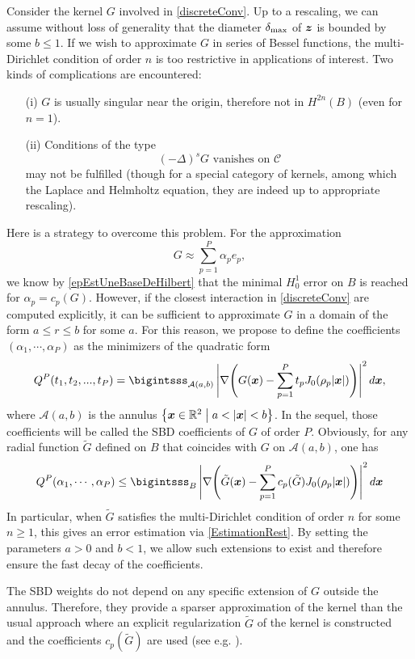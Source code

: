 \documentclass[11pt,a4paper]{article}
\begin{document}
Consider the kernel $G$ involved in \eqref{discreteConv}. Up to a rescaling, we can assume without loss of generality that the diameter $\delta_{\max}$ of $\boldsymbol{z}$ is bounded by some $b \leq 1$. 
If we wish to approximate $G$ in series of Bessel functions, the multi-Dirichlet condition of order $n$ is too restrictive in applications of interest. Two kinds of complications are encountered:
\begin{itemize}
	\item[(i)] $G$ is usually singular near the origin, therefore not in $H^{2n}(B)$ (even for $n=1$). 
	\item[(ii)] Conditions of the type 
	      \[(-\Delta)^s G \text{ vanishes on }\mathcal{C}\]   
	      may not be fulfilled (though for a special category of kernels, among which the Laplace and Helmholtz equation, they are indeed up to appropriate rescaling). 
\end{itemize}
Here is a strategy to overcome this problem. For the approximation 
\[G \approx \sum_{p = 1}^P \alpha_p e_p,\]
we know by \autoref{epEstUneBaseDeHilbert} that the minimal $H^1_0$ error on $B$ is reached for $\alpha_p = c_p(G)$. However, if the closest interaction in \eqref{discreteConv} are computed explicitly, it can be sufficient to approximate $G$ in a domain of the form $a \leq r \leq b$ for some $a$. For this reason, we propose to define the coefficients $(\alpha_1,\cdots,\alpha_P)$ as the minimizers of the quadratic form
\[ Q^P(t_1,t_2,...,t_P) = \bigintsss_{\mathcal{A}(a,b)} \left|\nabla \!\left( G(\bs{x}) - \sum_{p=1}^P t_p J_0(\rho_p |\bs{x}|)\right)\right|^2d\bs{x},\]
where $\mathcal{A}(a,b)$ is the annulus $\left\{\boldsymbol{x} \in \mathbb{R}^2\mathrel{}\middle|\mathrel{}a < \left\lvert \boldsymbol{x} \right\rvert < b\right\}$. In the sequel, those coefficients will be called the SBD coefficients of $G$ of order $P$. Obviously, for any radial function $\tilde{G}$ defined on $B$ that coincides with $G$ on $\mathcal{A}(a,b)$, one has 
\[ Q^P(\alpha_1,\cdots,\alpha_P) \leq \bigintsss_{B} \left|\nabla \!\left( \tilde{G}(\bs{x}) - \sum_{p=1}^P c_p(\tilde{G}) J_0(\rho_p |\bs{x}|)\right)\right|^2d\bs{x} \]
In particular, when $\tilde{G}$ satisfies the multi-Dirichlet condition of order $n$ for some $n \geq 1$, this gives an error estimation via \autoref{EstimationRest}. By setting the parameters $a>0$ and $b<1$, we allow such extensions to exist and therefore ensure the fast decay of the coefficients. 
\begin{Rem}
	\label{RemarqueQuiTuePotts}
	The SBD weights do not depend on any specific extension of $G$ outside the annulus. Therefore, they provide a sparser approximation of the kernel than the usual approach where an explicit regularization $\tilde{G}$ of the kernel is constructed and the coefficients $c_p(\tilde{G})$ are used (see e.g. \cite{potts2004fast}). 
\end{Rem}
\end{document}
